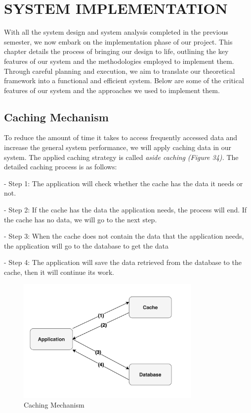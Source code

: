 \chapter{SYSTEM IMPLEMENTATION}

With all the system design and system analysis completed in the previous semester, we now embark on the implementation phase of our project. This chapter details the process of bringing our design to life, outlining the key features of our system and the methodologies employed to implement them. Through careful planning and execution, we aim to translate our theoretical framework into a functional and efficient system. Below are some of the critical features of our system and the approaches we used to implement them.


\section{Caching Mechanism}

To reduce the amount of time it takes to access frequently accessed data
and increase the general system performance, we will apply caching data
in our system. The applied caching strategy is called \emph{aside
    caching} \emph{(Figure 34).} The detailed caching process is as follows:

- Step 1: The application will check whether the cache has the data it
needs or not.

- Step 2: If the cache has the data the application needs, the process
will end. If the cache has no data, we will go to the next step.

- Step 3: When the cache does not contain the data that the application
needs, the application will go to the database to get the data

- Step 4: The application will save the data retrieved from the database
to the cache, then it will continue its work.

\begin{figure}[H]
    \centering
    \includegraphics[width=0.8\textwidth]{Figures/caching_strat.png}
    \caption{Caching Mechanism}
\end{figure}

